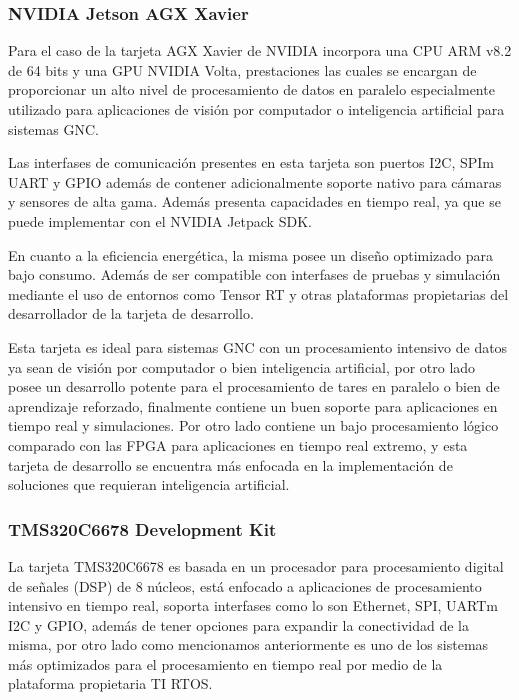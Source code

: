 \subsubsection{NVIDIA Jetson AGX Xavier}

Para el caso de la tarjeta AGX Xavier de NVIDIA incorpora una CPU ARM v8.2 de 64 bits y una GPU NVIDIA Volta, prestaciones las cuales se encargan de proporcionar un alto nivel de procesamiento de datos en paralelo especialmente utilizado para aplicaciones de visión por computador o inteligencia artificial para sistemas GNC. 

Las interfases de comunicación presentes en esta tarjeta son puertos I2C, SPIm UART y GPIO además de contener adicionalmente soporte nativo para cámaras y sensores de alta gama. Además presenta capacidades en tiempo real, ya que se puede implementar con el NVIDIA Jetpack SDK. 

En cuanto a la eficiencia energética, la misma posee un diseño optimizado para bajo consumo. Además de ser compatible con interfases de pruebas y simulación mediante el uso de entornos como Tensor RT y otras plataformas propietarias del desarrollador de la tarjeta de desarrollo.

Esta tarjeta es ideal para sistemas GNC con un procesamiento intensivo de datos ya sean de visión por computador o bien inteligencia artificial, por otro lado posee un desarrollo potente 
para el procesamiento de tares en paralelo o bien de aprendizaje reforzado, finalmente contiene un buen soporte para aplicaciones en tiempo real y simulaciones. Por otro lado contiene un 
bajo procesamiento lógico comparado con las FPGA para aplicaciones en tiempo real extremo, y esta tarjeta de desarrollo se encuentra más enfocada en la implementación de soluciones que
requieran inteligencia artificial.

\subsubsection{TMS320C6678 Development Kit}

La tarjeta TMS320C6678 es basada en un procesador para procesamiento digital de señales (DSP) de 8 núcleos, está enfocado a aplicaciones de procesamiento intensivo en tiempo real, soporta
interfases como lo son Ethernet, SPI, UARTm I2C y GPIO, además de tener opciones para expandir la conectividad de la misma, por otro lado como mencionamos anteriormente es uno de los sistemas
más optimizados para el procesamiento en tiempo real por medio de la plataforma propietaria TI RTOS.

